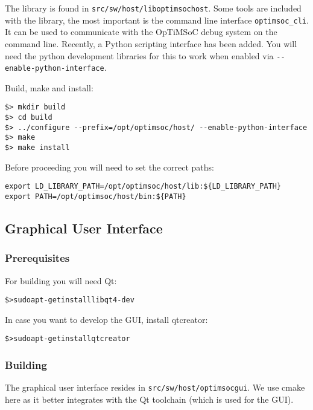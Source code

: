 The library is found in \verb|src/sw/host/liboptimsochost|.  Some
tools are included with the library, the most important is the command
line interface \verb|optimsoc_cli|. It can be used to communicate with
the OpTiMSoC debug system on the command line. Recently, a Python
scripting interface has been added. You will need the python
development libraries for this to work when enabled via
\verb|--enable-python-interface|.

Build, make and install:

\begin{verbatim}
$> mkdir build
$> cd build
$> ../configure --prefix=/opt/optimsoc/host/ --enable-python-interface
$> make
$> make install
\end{verbatim}

Before proceeding you will need to set the correct paths:

\begin{verbatim}
export LD_LIBRARY_PATH=/opt/optimsoc/host/lib:${LD_LIBRARY_PATH}
export PATH=/opt/optimsoc/host/bin:${PATH}
\end{verbatim}

\subsection{Graphical User Interface}

\subsubsection{Prerequisites}

For building you will need Qt:

\begin{alltt}
\$> sudo apt-get install libqt4-dev
\end{alltt}

In case you want to develop the GUI, install qtcreator:

\begin{alltt}
\$> sudo apt-get install qtcreator
\end{alltt}

\subsubsection{Building}

The graphical user interface resides in
\verb|src/sw/host/optimsocgui|. We use cmake here as it better
integrates with the Qt toolchain (which is used for the GUI).

